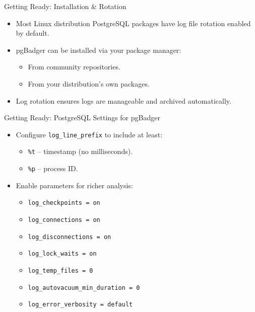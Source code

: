 \documentclass[aspectratio=169]{beamer}
\begin{document}
\begin{frame}{Getting Ready: Installation \& Rotation}
\begin{itemize}
    \item Most Linux distribution PostgreSQL packages have log file rotation enabled by default.
    \item pgBadger can be installed via your package manager:
    \begin{itemize}
        \item From community repositories.
        \item From your distribution’s own packages.
    \end{itemize}
    \item Log rotation ensures logs are manageable and archived automatically.
\end{itemize}
\end{frame}

\begin{frame}{Getting Ready: PostgreSQL Settings for pgBadger}
\begin{itemize}
    \item Configure \texttt{log\_line\_prefix} to include at least:
    \begin{itemize}
        \item \texttt{\%t} – timestamp (no milliseconds).
        \item \texttt{\%p} – process ID.
    \end{itemize}
    \item Enable parameters for richer analysis:
    \begin{itemize}
        \item \texttt{log\_checkpoints = on}
        \item \texttt{log\_connections = on}
        \item \texttt{log\_disconnections = on}
        \item \texttt{log\_lock\_waits = on}
        \item \texttt{log\_temp\_files = 0}
        \item \texttt{log\_autovacuum\_min\_duration = 0}
        \item \texttt{log\_error\_verbosity = default}
    \end{itemize}
\end{itemize}
\end{frame}
\end{document}
